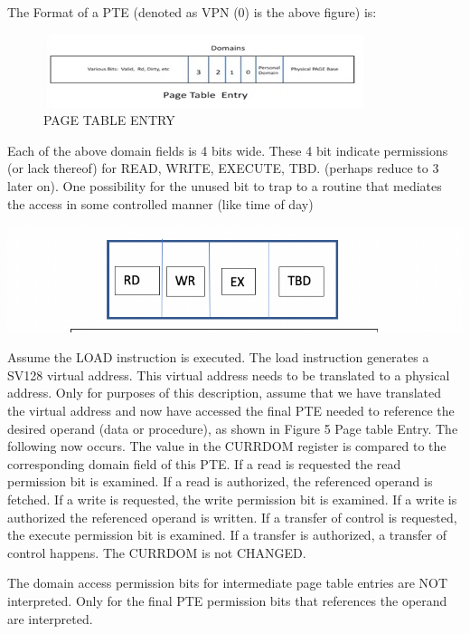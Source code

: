 \documentclass{article}
\begin{document}
The Format of a PTE (denoted as VPN (0) is the above figure) is:

\begin{figure}
\includegraphics[scale=.8]{figures/figure2b_pte.jpg}
\caption{PAGE TABLE ENTRY}
\end{figure}

Each of the above domain fields is 4 bits wide.  These 4 bit indicate permissions (or lack thereof) for READ,  WRITE,  EXECUTE,  TBD. (perhaps reduce to 3 later on). One possibility for the unused bit to trap to a routine that mediates the access in some controlled  manner (like time of day)

\begin{center}
\includegraphics[scale=.4]
{figures/figure5a_domain_permissions.jpg}
\centering
\end{center}

Assume the LOAD instruction is executed.  The load instruction generates a SV128 virtual address.  This virtual address needs to be translated to a physical address.  Only for purposes of this description, assume that we have translated the virtual address and now have accessed the final PTE needed to reference the desired operand (data or procedure), as shown in Figure 5 Page table Entry.   The following now occurs.  The value in the CURRDOM register is compared to the corresponding domain field of this PTE.   If a read is requested the read permission bit is examined.  If a read is authorized,  the referenced operand is fetched.  If a write is requested,  the write permission bit is examined.  If a write is authorized the referenced operand is written.  If a transfer of control is requested,  the execute permission bit is examined.  If  a transfer is authorized,  a transfer of control happens.  The CURRDOM is not  CHANGED.

The domain access permission bits for intermediate page table entries are NOT interpreted.   Only for the final PTE permission bits that references the operand  are interpreted.
\end{document}
